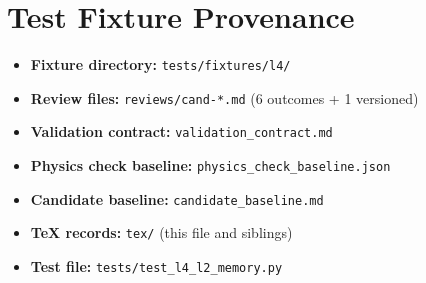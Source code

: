 \documentclass[11pt,a4paper]{article}
\begin{document}
%
%

\section{Test Fixture Provenance}

\begin{itemize}
  \item \textbf{Fixture directory:} \texttt{tests/fixtures/l4/}
  \item \textbf{Review files:} \texttt{reviews/cand-*.md} (6 outcomes + 1 versioned)
  \item \textbf{Validation contract:} \texttt{validation\_contract.md}
  \item \textbf{Physics check baseline:} \texttt{physics\_check\_baseline.json}
  \item \textbf{Candidate baseline:} \texttt{candidate\_baseline.md}
  \item \textbf{TeX records:} \texttt{tex/} (this file and siblings)
  \item \textbf{Test file:} \texttt{tests/test\_l4\_l2\_memory.py}
\end{itemize}
\end{document}
